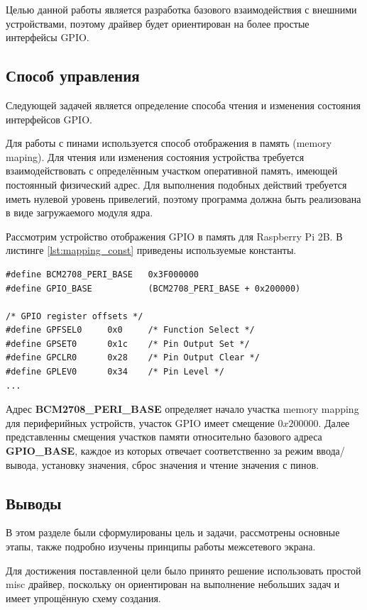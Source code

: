 Целью данной работы является разработка базового взаимодействия с внешними устройствами, поэтому  драйвер будет ориентирован на более простые интерфейсы GPIO.


\subsection{Способ управления}
Следующей задачей является определение способа чтения и изменения состояния интерфейсов GPIO.

Для работы с пинами используется способ отображения в память (memory maping). Для чтения или изменения состояния устройства требуется взаимодействовать с определённым участком оперативной память, имеющей постоянный физический адрес. Для выполнения подобных действий требуется иметь нулевой уровень привелегий, поэтому программа должна быть реализована в виде загружаемого модуля ядра.

Рассмотрим устройство отображения GPIO в память для Raspberry Pi 2B. В листинге \ref{lst:mapping_const} приведены используемые константы.
\begin{lstlisting}[caption = {struct module}, label=lst:mapping_const]
#define BCM2708_PERI_BASE	0x3F000000
#define GPIO_BASE           (BCM2708_PERI_BASE + 0x200000) 	

/* GPIO register offsets */
#define GPFSEL0		0x0		/* Function Select */
#define GPSET0		0x1c	/* Pin Output Set */
#define GPCLR0		0x28	/* Pin Output Clear */
#define GPLEV0		0x34	/* Pin Level */
...
\end{lstlisting}

Адрес \textbf{BCM2708_PERI_BASE} определяет начало участка memory mapping для периферийных устройств, участок GPIO имеет смещение $0x200000$. Далее представленны смещения участков памяти относительно базового адреса \textbf{GPIO_BASE}, каждое из которых отвечает соответственно за режим ввода/вывода, установку значения, сброс значения и чтение значения с пинов.

\subsection{Выводы}
В этом разделе были сформулированы цель и задачи, рассмотрены основные этапы, также подробно изучены принципы работы межсетевого экрана. 

Для достижения поставленной цели было принято решение использовать простой misc драйвер, поскольку он ориентирован на выполнение небольших задач и имеет упрощённую схему создания.


